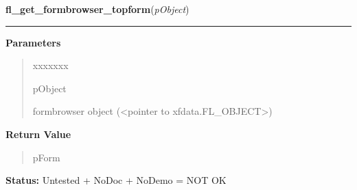 \hspace{.8\funcindent}\begin{boxedminipage}{\funcwidth}

    \raggedright \textbf{fl\_get\_formbrowser\_topform}(\textit{pObject})

    \vspace{-1.5ex}

    \rule{\textwidth}{0.5\fboxrule}
\setlength{\parskip}{2ex}
\setlength{\parskip}{1ex}
      \textbf{Parameters}
      \vspace{-1ex}

      \begin{quote}
        \begin{Ventry}{xxxxxxx}

          \item[pObject]

          formbrowser object ({\textless}pointer to 
          xfdata.FL\_OBJECT{\textgreater})

        \end{Ventry}

      \end{quote}

      \textbf{Return Value}
    \vspace{-1ex}

      \begin{quote}
      pForm

      \end{quote}

\textbf{Status:} Untested + NoDoc + NoDemo = NOT OK



    \end{boxedminipage}

    \label{xformslib:library:fl_set_formbrowser_topform}

    \vspace{0.5ex}

